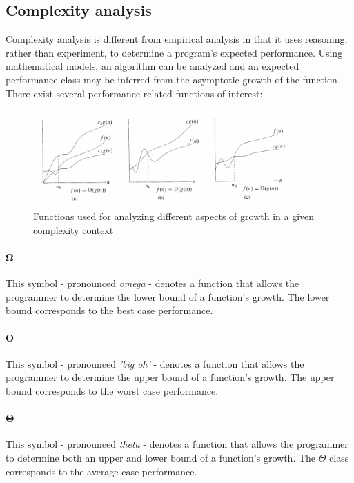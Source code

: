 \documentclass{article}
\begin{document}
\subsection{Complexity analysis}
Complexity analysis is different from empirical analysis in that it uses reasoning, rather than experiment, to determine
a program's expected performance. Using mathematical models, an algorithm can be analyzed and an expected performance class
may be inferred from the asymptotic growth of the function \cite[p.43-49]{introduction-to-algorithms}. There exist several
performance-related functions of interest:

\begin{samepage}
  \begin{figure}[H]
    \centering
    \includegraphics[width=10cm]{theta_o_omega}
    \caption{Functions used for analyzing different aspects of growth in a given complexity context
     \cite[p.45]{introduction-to-algorithms}}
  \end{figure}
  
  \paragraph{\(\boldsymbol \Omega\)}
  This symbol - pronounced {\em omega} - denotes a function that allows the programmer to determine the lower bound of a
  function's growth. The lower bound corresponds to the best case performance.
  
  \paragraph{\(\boldsymbol O\)}
  This symbol - pronounced {\em 'big oh'} - denotes a function that allows the programmer to determine the upper bound of a
  function's growth. The upper bound corresponds to the worst case performance.
  
  \paragraph{\(\boldsymbol \Theta\)}
  This symbol - pronounced {\em theta} - denotes a function that allows the programmer to determine both an upper and lower
  bound of a function's growth. The \(\Theta\) class corresponds to the average case performance.
\end{samepage}
\end{document}
